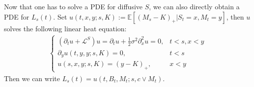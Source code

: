 \documentclass[openany,oneside]{article}
\theoremstyle{definition}
\theoremstyle{remark}
\newcommand{\E}{\mathbb{E}} %
\begin{document}
Now that one has to solve a PDE for diffusive $S$, we can also directly obtain a PDE for $L_s(t)$. Set $u(t,x,y;s,K):=\E\left[(M_s-K)_+ \vert S_t=x, M_t=y\right]$, then $u$ solves the following linear heat equation:
\begin{align*}
\begin{cases}
(\partial_t u + \mathcal{L}^S)u = \partial_t u + \frac{1}{2}\sigma^2\partial^2_x u = 0, & t<s, x<y \\
\partial_y u(t,y,y;s,K) = 0, & t<s \\
u(s,x,y;s,K) = (y-K)_+, & x<y
\end{cases}
\end{align*}
Then we can write $L_s(t) = u(t,B_t,M_t;s,c\vee M_t)$.



{}

\end{document}
